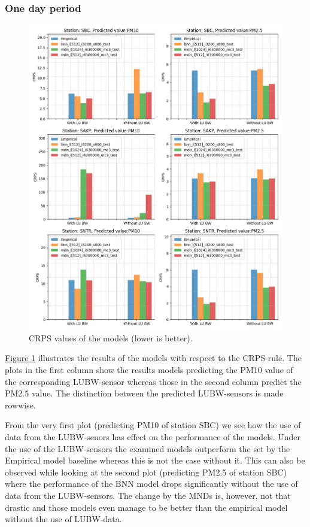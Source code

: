\documentclass[12pt,a4paper,twoside]{scrartcl}
\numberwithin{equation}{section}
\newcommand{\reffig}[1]{\hyperref[#1]{Figure \ref*{#1}}}
\begin{document}
\subsubsection{One day period}\label{sec:res-1d}
\begin{center}
  \begin{figure}[htbp] \centering \includegraphics[height=1\textwidth,
    width=1\textwidth]{figures/figs_1d/results_plot_CRPS}
    \caption[CRPS results (daily average)]{CRPS values of the models
      (lower is better).}\label{fig:crps-1d}
  \end{figure}
\end{center}
\vspace{-1.3cm}

\reffig{fig:crps-1d} illustrates the results of the models with respect to the CRPS-rule. The plots in the first column show the results models predicting the PM10 value of the corresponding LUBW-sensor whereas those in the second column predict the PM2.5 value. The distinction between the predicted LUBW-sensors is made rowwise.

From the very first plot (predicting PM10 of station SBC) we see how the use of data from the LUBW-senors has effect on the performance of the models. Under the use of the LUBW-sensors the examined models outperform the set by the Empirical model baseline whereas this is not the case without it. This can also be observed while looking at the second plot (predicting PM2.5 of station SBC) where the performance of the BNN model drops significantly without the use of data from the LUBW-sensors. The change by the MNDs is, however, not that drastic and those models even manage to be better than the empirical model without the use of LUBW-data.
\end{document}
